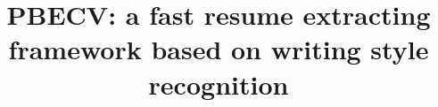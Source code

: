 \documentclass{acm_proc_article-sp}
\begin{document}
\title{PBECV: a fast resume extracting framework based on writing style recognition}

%
%
%
%
%

%
%
%
\end{document}
